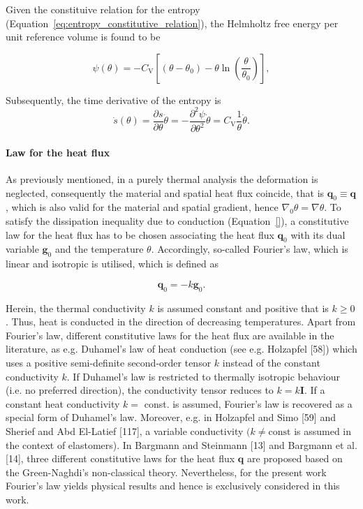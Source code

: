 Given the constituive relation for the entropy (Equation~\eqref{eq:entropy_constitutive_relation}), the Helmholtz free energy per unit reference volume is found to be
\begin{highlight}
\begin{equation}
\psi(\theta)=- C_{\mathrm{V}}\left[\left(\theta-\theta_{0}\right)-\theta \ln \left(\frac{\theta}{\theta_{0}}\right)\right],
\end{equation}
\end{highlight}
Subsequently, the time derivative of the entropy is
\begin{equation}
\dot{s}(\theta)=\frac{\partial s}{\partial \theta} \dot{\theta}=-\frac{\partial^{2} \psi}{\partial \theta^{2}} \dot{\theta}=C_{\mathrm{V}} \frac{1}{\theta} \dot{\theta}.
\end{equation}

\paragraph{Law for the heat flux}
As previously mentioned, in a purely thermal analysis the deformation is neglected, consequently the material and spatial heat flux coincide, that is \(\bm q_0 \equiv \bm q\), which is also valid for the material and spatial gradient, hence \(\nabla_0 \theta = \nabla \theta\).
To satisfy the dissipation inequality due to conduction (Equation~\eqref{}), a constitutive law for the heat flux has to be chosen associating the heat flux \(\bm q_0\) with its dual variable \(\bm g_0\) and the temperature \(\theta\).
Accordingly, so-called Fourier's law, which is linear and isotropic is utilised, which is defined as
\begin{highlight}
\begin{equation}
  \bm q_0=-k \bm g_0.
\end{equation}
\end{highlight}
Herein, the thermal conductivity \(k\) is assumed constant and positive that is \(k \geq 0\).
Thus, heat is conducted in the direction of decreasing temperatures.
Apart from Fourier's law, different constitutive laws for the heat flux are available in the literature, as e.g. Duhamel's law of heat conduction (see e.g. \cite{}Holzapfel [58]) which uses a positive semi-definite second-order tensor \(k\) instead of the constant conductivity \(k\).
If Duhamel's law is restricted to thermally isotropic behaviour (i.e. no preferred direction), the conductivity tensor reduces to \(k=k \boldsymbol{I}\).
If a constant heat conductivity \(k=\) const. is assumed, Fourier's law is recovered as a special form of Duhamel's law.
Moreover, e.g. in Holzapfel and Simo [59] and Sherief and Abd El-Latief [117], a variable conductivity \((k \neq \mathrm{const}\) is assumed in the context of elastomers).
In Bargmann and Steinmann [13] and Bargmann et al. [14], three different constitutive laws for the heat flux \(\bm q\) are proposed based on the Green-Naghdi's non-classical theory.
Nevertheless, for the present work Fourier's law yields physical results and hence is exclusively considered in this work.


